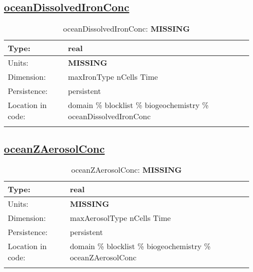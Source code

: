\subsection[oceanDissolvedIronConc]{\hyperref[sec:var_tab_biogeochemistry]{oceanDissolvedIronConc}}
\label{subsec:var_sec_biogeochemistry_oceanDissolvedIronConc}
\begin{center}
\begin{longtable}{| p{2.0in} | p{4.0in} |}
        \hline 
        Type: & real \\
        \hline 
        Units: & {\bf \color{red} MISSING} \\
        \hline 
        Dimension: & maxIronType nCells Time \\
        \hline 
        Persistence: & persistent \\
        \hline 
         Location in code: & domain \% blocklist \% biogeochemistry \% oceanDissolvedIronConc \\
         \hline 
    \caption{oceanDissolvedIronConc: {\bf \color{red} MISSING}}
\end{longtable}
\end{center}
\subsection[oceanZAerosolConc]{\hyperref[sec:var_tab_biogeochemistry]{oceanZAerosolConc}}
\label{subsec:var_sec_biogeochemistry_oceanZAerosolConc}
\begin{center}
\begin{longtable}{| p{2.0in} | p{4.0in} |}
        \hline 
        Type: & real \\
        \hline 
        Units: & {\bf \color{red} MISSING} \\
        \hline 
        Dimension: & maxAerosolType nCells Time \\
        \hline 
        Persistence: & persistent \\
        \hline 
         Location in code: & domain \% blocklist \% biogeochemistry \% oceanZAerosolConc \\
         \hline 
    \caption{oceanZAerosolConc: {\bf \color{red} MISSING}}
\end{longtable}
\end{center}
